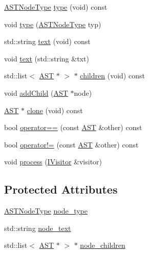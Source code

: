 \begin{DoxyCompactItemize}
\item 
\hyperlink{ast_8h_a0a931957f12a2075e6e11ee596651dff}{A\-S\-T\-Node\-Type} \hyperlink{class_a_s_t_ad947af30e5dbb743c41769296dc03c9d}{type} (void) const 
\item 
void \hyperlink{class_a_s_t_a3bf7042778ad5c589b65dd1b276f093c}{type} (\hyperlink{ast_8h_a0a931957f12a2075e6e11ee596651dff}{A\-S\-T\-Node\-Type} typ)
\item 
std\-::string \hyperlink{class_a_s_t_ad975048d27d24ffe87e95b1eed995d5e}{text} (void) const 
\item 
void \hyperlink{class_a_s_t_a5b90708376a408b1e1ff5762975017e9}{text} (std\-::string \&txt)
\item 
std\-::list$<$ \hyperlink{class_a_s_t}{A\-S\-T} $\ast$ $>$ $\ast$ \hyperlink{class_a_s_t_addfd95ed0ba31ec4fdcf08097fb7fa75}{children} (void) const 
\item 
void \hyperlink{class_a_s_t_a131ed8cb88639003df1058f768820cc5}{add\-Child} (\hyperlink{class_a_s_t}{A\-S\-T} $\ast$node)
\item 
\hyperlink{class_a_s_t}{A\-S\-T} $\ast$ \hyperlink{class_a_s_t_a787d24b79bf03b6ae15f10d9fad3411b}{clone} (void) const 
\item 
bool \hyperlink{class_a_s_t_a2329c4b895ed7832713563d00b89e978}{operator==} (const \hyperlink{class_a_s_t}{A\-S\-T} \&other) const 
\item 
bool \hyperlink{class_a_s_t_a00250cbeed3c73d95d4117b20d8146dd}{operator!=} (const \hyperlink{class_a_s_t}{A\-S\-T} \&other) const 
\item 
void \hyperlink{class_a_s_t_af8504282645b3e5baebabc486877ea1e}{process} (\hyperlink{class_i_visitor}{I\-Visitor} \&visitor)
\end{DoxyCompactItemize}
\subsection*{Protected Attributes}
\begin{DoxyCompactItemize}
\item 
\hyperlink{ast_8h_a0a931957f12a2075e6e11ee596651dff}{A\-S\-T\-Node\-Type} \hyperlink{class_a_s_t_aa650b2056cd9f76cc9b8833ca5faf312}{node\-\_\-type}
\item 
std\-::string \hyperlink{class_a_s_t_a1638e0900cea081df5bb23d76432a2c3}{node\-\_\-text}
\item 
std\-::list$<$ \hyperlink{class_a_s_t}{A\-S\-T} $\ast$ $>$ $\ast$ \hyperlink{class_a_s_t_acb9265830632be3a68812c66c08c8752}{node\-\_\-children}
\end{DoxyCompactItemize}


